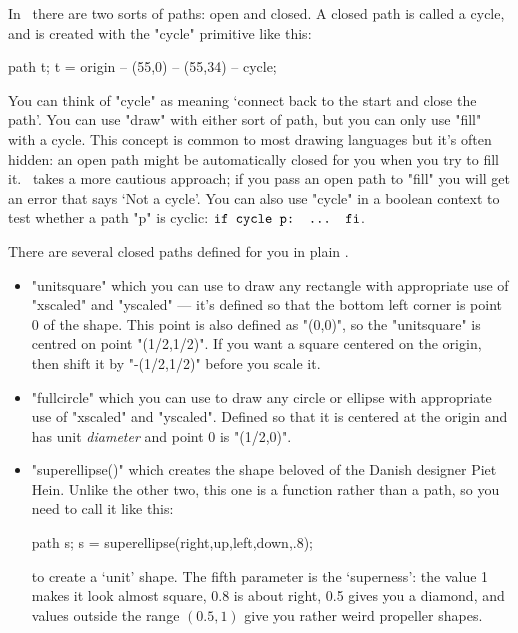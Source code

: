 \documentclass[a4paper,landscape]{article}
\def\mpic#1#2{\vadjust{\moveright5.5in\vbox to 0pt{\hsize4in\vskip#1\centerline{\texttt{[image: \#2]}}\vss}}}
\begin{document}
In \MP\ there are two sorts of paths: open and closed.  
\mpic{-12pt}{closed0}
A closed path is called a cycle, and is created with the "cycle" primitive like this:
\begin{code}
path t; t = origin -- (55,0) -- (55,34) -- cycle;
\end{code}
You can think of "cycle" as meaning ‘connect back to the start and close the path’.
You can use "draw" with either sort of path, but you can only use "fill" with a
cycle.  This concept is common to most drawing languages but it’s often hidden:  an
open path might be automatically closed for you when you try to fill it.  \MP\ takes
a more cautious approach; if you pass an open path to "fill" you will get an error
that says ‘Not a cycle’.  You can also use "cycle" in a boolean context to test
whether a path "p" is cyclic: 
$\hbox{\ttfamily if cycle p: ... fi}$.

\medskip\noindent
There are several closed paths defined for you in plain \MP. 
\mpic{1cm}{closed7}
\begin{itemize}
    \item "unitsquare" which you can use to draw any rectangle with appropriate
        use of "xscaled" and "yscaled" --- it’s defined so that the bottom left
        corner is point 0 of the shape.  This point is also defined as "(0,0)", 
        so the "unitsquare" is centred on point "(1/2,1/2)".  If you want a square
        centered on the origin, then shift it by "-(1/2,1/2)" before you scale it.

    \item "fullcircle" which you can use to draw any circle or ellipse with
        appropriate use of "xscaled" and "yscaled".  Defined so that it is centered
        at the origin and has unit \textit{diameter} and point 0 is "(1/2,0)".

    \item "superellipse()" which creates the shape beloved of the Danish designer Piet Hein.  Unlike the
        other two, this one is a function rather than a path, so you need to call it
        like this:
        \begin{code}
        path s; s = superellipse(right,up,left,down,.8);
        \end{code}
        to create a ‘unit’ shape.  The fifth parameter is the ‘superness’: the value
        1 makes it look almost square, 0.8 is about right, 0.5 gives you a diamond,
        and values outside the range $(0.5,1)$ give you rather weird propeller
        shapes.
\end{itemize}
\end{document}
